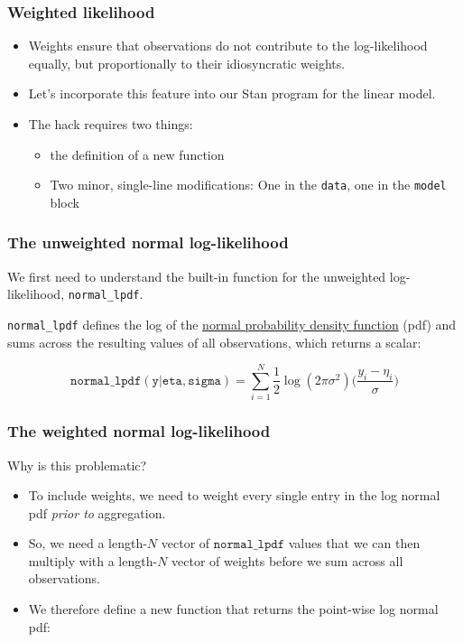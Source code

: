 \documentclass[
  11pt,
]{article}
\providecommand{\tightlist}{%
  \setlength{\itemsep}{0pt}\setlength{\parskip}{0pt}}
\begin{document}
\hypertarget{weighted-likelihood}{%
\subsubsection{Weighted likelihood}\label{weighted-likelihood}}

\begin{itemize}
\tightlist
\item
  Weights ensure that observations do not contribute to the log-likelihood equally, but proportionally to their idiosyncratic weights.
\item
  Let's incorporate this feature into our Stan program for the linear model.
\item
  The hack requires two things:

  \begin{itemize}
  \tightlist
  \item
    the definition of a new function
  \item
    Two minor, single-line modifications: One in the \texttt{data}, one in the \texttt{model} block
  \end{itemize}
\end{itemize}

\hypertarget{the-unweighted-normal-log-likelihood}{%
\subsubsection{The unweighted normal log-likelihood}\label{the-unweighted-normal-log-likelihood}}

We first need to understand the built-in function for the unweighted log-likelihood, \texttt{normal\_lpdf}.

\texttt{normal\_lpdf} defines the log of the \href{https://en.wikipedia.org/wiki/Normal_distribution}{normal probability density function} (pdf) and sums across the resulting values of all observations, which returns a scalar:

\[ \mathtt{normal\_lpdf(y | eta, sigma)} = \sum_{i=1}^{N}\frac{1}{2} \log (2 \pi \sigma^2) \Big( \frac{y_i-\eta_i}{\sigma}\Big)\]

\hypertarget{the-weighted-normal-log-likelihood}{%
\subsubsection{The weighted normal log-likelihood}\label{the-weighted-normal-log-likelihood}}

Why is this problematic?

\begin{itemize}
\tightlist
\item
  To include weights, we need to weight every single entry in the log normal pdf \emph{prior to} aggregation.
\item
  So, we need a length-\(N\) vector of \(\mathtt{normal\_lpdf}\) values that we can then multiply with a length-\(N\) vector of weights before we sum across all observations.
\item
  We therefore define a new function that returns the point-wise log normal pdf:
\end{itemize}
\end{document}
